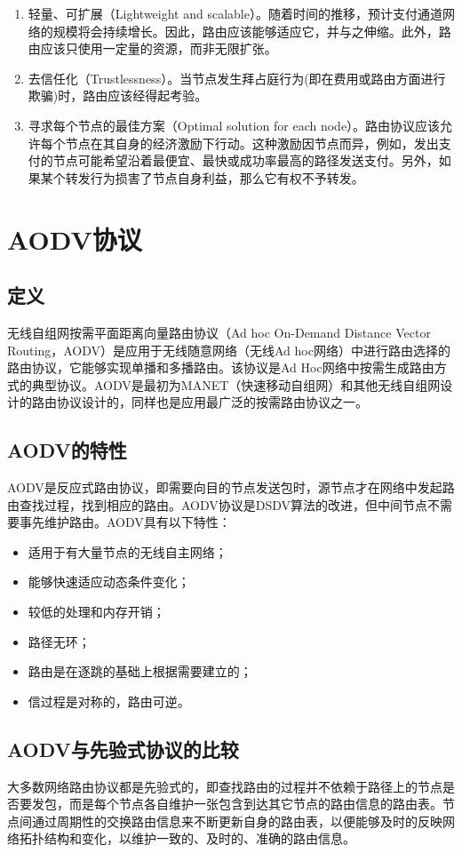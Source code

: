 \documentclass[12pt,a4paper]{article}
\begin{document}
\begin{enumerate}
	\item 轻量、可扩展（Lightweight and scalable）。随着时间的推移，预计支付通道网络的规模将会持续增长。因此，路由应该能够适应它，并与之伸缩。此外，路由应该只使用一定量的资源，而非无限扩张。

	\item 去信任化（Trustlessness）。当节点发生拜占庭行为(即在费用或路由方面进行欺骗)时，路由应该经得起考验。

	\item 寻求每个节点的最佳方案（Optimal solution for each node）。路由协议应该允许每个节点在其自身的经济激励下行动。这种激励因节点而异，例如，发出支付的节点可能希望沿着最便宜、最快或成功率最高的路径发送支付。另外，如果某个转发行为损害了节点自身利益，那么它有权不予转发。
\end{enumerate}
\clearpage

\section{AODV协议}

\subsection{定义}
无线自组网按需平面距离向量路由协议（Ad hoc On-Demand Distance Vector Routing，AODV）是应用于无线随意网络（无线Ad hoc网络）中进行路由选择的路由协议，它能够实现单播和多播路由。该协议是Ad Hoc网络中按需生成路由方式的典型协议。AODV是最初为MANET（快速移动自组网）和其他无线自组网设计的路由协议设计的，同样也是应用最广泛的按需路由协议之一。

\subsection{AODV的特性}
AODV是反应式路由协议，即需要向目的节点发送包时，源节点才在网络中发起路由查找过程，找到相应的路由。AODV协议是DSDV算法的改进，但中间节点不需要事先维护路由。AODV具有以下特性：
\begin{itemize}
	\item 适用于有大量节点的无线自主网络；
	\item 能够快速适应动态条件变化；
	\item 较低的处理和内存开销；
	\item 路径无环；
	\item 路由是在逐跳的基础上根据需要建立的；
	\item 信过程是对称的，路由可逆。
\end{itemize}

\subsection{AODV与先验式协议的比较}
大多数网络路由协议都是先验式的，即查找路由的过程并不依赖于路径上的节点是否要发包，而是每个节点各自维护一张包含到达其它节点的路由信息的路由表。节点间通过周期性的交换路由信息来不断更新自身的路由表，以便能够及时的反映网络拓扑结构和变化，以维护一致的、及时的、准确的路由信息。
\end{document}
